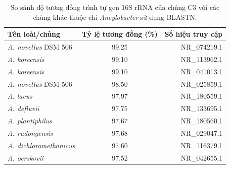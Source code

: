 \documentclass[journal]{IEEEtran}
\begin{document}
	\begin{table}[h]
		\caption{So sánh độ tương đồng trình tự gen 16S rRNA của chủng C3 với các chủng khác thuộc chi \textit{Ancylobacter} sử dụng BLASTN.} \label{table_1}
		\begin{tabularx}{0.49\textwidth}{Xcr}
			\hline
			\textbf{Tên loài/chủng} & \textbf{Tỷ lệ tương đồng (\%)} & \textbf{Số hiệu truy cập} \\ \hline
			
			\textit{A. novellus} DSM 506        & 99.25                                          & NR\_074219.1                                   \\
			
			\textit{A. koreensis}               & 99.10                                          & NR\_113962.1                                   \\
			
			\textit{A. koreensis}               & 99.10                                          & NR\_041013.1                                   \\
			
			\textit{A. novellus} DSM 506        & 98.50                                          & NR\_025859.1                                   \\
			
			\textit{A. lacus}                   & 97.97                                          & NR\_180559.1 \\
			
			\textit{A. defluvii}                & 97.75                                          & NR\_133695.1                                   \\
			
			\textit{A. plantiphilus}            & 97.67                                          & NR\_180560.1                                   \\
			
			\textit{A. rudongensis}             & 97.68                                          & NR\_029047.1                                   \\
			
			\textit{A. dichloromethanicus}      & 97.60                                          & NR\_116379.1                                   \\
			
			\textit{A. oerskovii}               & 97.52                                          & NR\_042655.1                                   \\ \hline
		\end{tabularx}
	\end{table}
	
\end{document}
